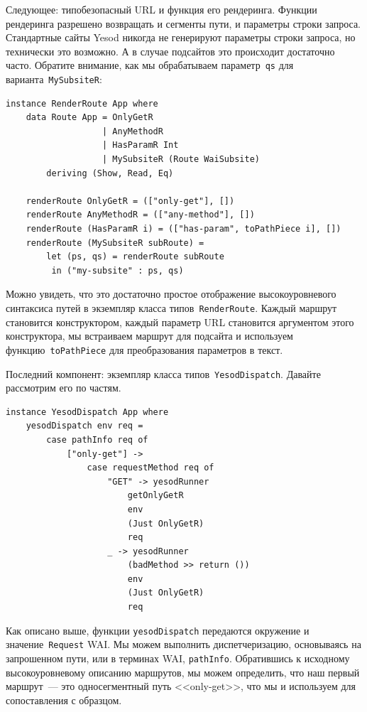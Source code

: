 Следующее: типобезопасный URL и функция его рендеринга. Функции рендеринга
разрешено возвращать и сегменты пути, и параметры строки запроса. Стандартные
сайты Yesod никогда не генерируют параметры строки запроса, но технически это
возможно. А в случае подсайтов это происходит достаточно часто. Обратите
внимание, как мы обрабатываем параметр~\lstinline'qs' для
варианта~\lstinline'MySubsiteR':
\begin{lstlisting}
instance RenderRoute App where
    data Route App = OnlyGetR
                   | AnyMethodR
                   | HasParamR Int
                   | MySubsiteR (Route WaiSubsite)
        deriving (Show, Read, Eq)

    renderRoute OnlyGetR = (["only-get"], [])
    renderRoute AnyMethodR = (["any-method"], [])
    renderRoute (HasParamR i) = (["has-param", toPathPiece i], [])
    renderRoute (MySubsiteR subRoute) =
        let (ps, qs) = renderRoute subRoute
         in ("my-subsite" : ps, qs)
\end{lstlisting}

Можно увидеть, что это достаточно простое отображение высокоуровневого
синтаксиса путей в экземпляр класса типов~\lstinline'RenderRoute'. Каждый
маршрут становится конструктором, каждый параметр URL становится аргументом
этого конструктора, мы встраиваем маршрут для подсайта и используем
функцию~\lstinline'toPathPiece' для преобразования параметров в текст.

Последний компонент: экземпляр класса типов~\lstinline'YesodDispatch'. Давайте
рассмотрим его по частям.

\begin{lstlisting}
instance YesodDispatch App where
    yesodDispatch env req =
        case pathInfo req of
            ["only-get"] ->
                case requestMethod req of
                    "GET" -> yesodRunner
                        getOnlyGetR
                        env
                        (Just OnlyGetR)
                        req
                    _ -> yesodRunner
                        (badMethod >> return ())
                        env
                        (Just OnlyGetR)
                        req
\end{lstlisting}

Как описано выше, функции \lstinline'yesodDispatch' передаются окружение и
значение~\lstinline'Request' WAI. Мы можем выполнить диспетчеризацию,
основываясь на запрошенном пути, или в терминах WAI, \lstinline'pathInfo'.
Обратившись к исходному высокоуровневому описанию маршрутов, мы можем
определить, что наш первый маршрут~--- это односегментный путь <<only-get>>,
что мы и используем для сопоставления с образцом.

